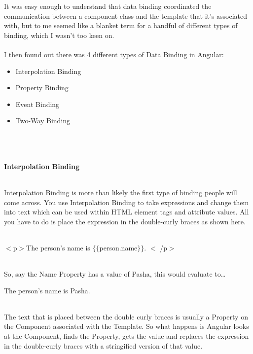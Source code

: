 \documentclass{article}
\begin{document}
\noindent 

\noindent It was easy enough to understand that data binding coordinated the communication between a component class and the template that it's associated with, but to me seemed like a blanket term for a handful of different types of binding, which I wasn't too keen on.
\\  
\noindent 
\\  
\noindent I then found out there was 4 different types of Data Binding in Angular:

\begin{itemize}
	\item Interpolation Binding 
	\item Property Binding
	\item Event Binding 
	\item Two-Way Binding 
\end{itemize}


\noindent 
\\  
{\large \noindent \\ \\ \textbf{Interpolation Binding}}

\noindent 
\\  
\noindent Interpolation Binding is more than likely the first type of binding people will come across. You use Interpolation Binding to take expressions and change them into text which can be used within HTML element tags and attribute values. All you have to do is place the expression in the double-curly braces as shown here.

\noindent 

\noindent \\ $\mathrm{<}$p$\mathrm{>}$The person's name is $\mathrm{\{}$$\mathrm{\{}$person.name$\mathrm{\}}$$\mathrm{\}}$. $\mathrm{<}$ /p$\mathrm{>}$

\noindent \\ So, say the Name Property has a value of Pasha, this would evaluate to{\dots}

\noindent 

\noindent The person's name is Pasha.

\noindent 

\noindent \\ The text that is placed between the double curly braces is usually a Property on the Component associated with the Template. So what happens is Angular looks at the Component, finds the Property, gets the value and replaces the expression in the double-curly braces with a stringified version of that value.
\end{document}
